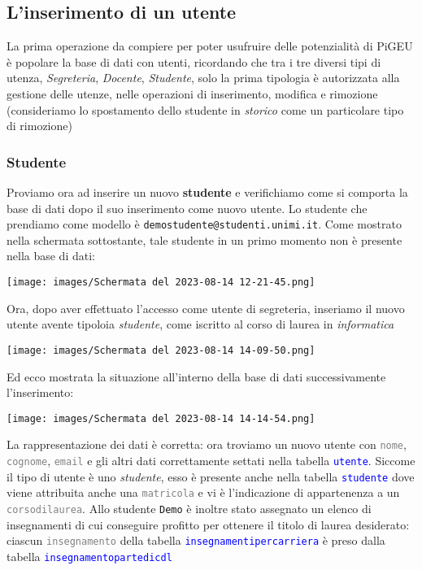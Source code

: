 \documentclass{article}
\newcommand{\tabb}[1]{\texttt{\textcolor{blue}{#1}}}
\newcommand{\attr}[1]{\texttt{\textcolor{gray}{#1}}}
\newcommand{\und}[0]{\textunderscore}
\begin{document}
\subsection{L'inserimento di un utente}
La prima operazione da compiere per poter usufruire delle potenzialità di PiGEU è popolare la base di dati con utenti, ricordando che tra i tre diversi tipi di utenza, \textit{Segreteria}, \textit{Docente}, \textit{Studente}, solo la prima tipologia è autorizzata alla gestione delle utenze, nelle operazioni di inserimento, modifica e rimozione (consideriamo lo spostamento dello studente in \textit{storico} come un particolare tipo di rimozione)
\subsubsection{Studente}
Proviamo ora ad inserire un nuovo \textbf{studente} e verifichiamo come si comporta la base di dati dopo il suo inserimento come nuovo utente.
Lo studente che prendiamo come modello è \texttt{demo\und studente@studenti.unimi.it}. Come mostrato nella schermata sottostante, tale studente in un primo momento non è presente nella base di dati:

\texttt{[image: images/Schermata del 2023-08-14 12-21-45.png]}

Ora, dopo aver effettuato l'accesso come utente di segreteria, inseriamo il nuovo utente avente tipoloia \textit{studente}, come iscritto al corso di laurea in \textit{informatica}

\texttt{[image: images/Schermata del 2023-08-14 14-09-50.png]}

Ed ecco mostrata la situazione all'interno della base di dati successivamente l'inserimento:

\texttt{[image: images/Schermata del 2023-08-14 14-14-54.png]}

La rappresentazione dei dati è corretta: ora troviamo un nuovo utente con \attr{nome}, \attr{cognome}, \attr{email} e gli altri dati correttamente settati nella tabella \tabb{utente}. Siccome il tipo di utente è uno \textit{studente}, esso è presente anche nella tabella \tabb{studente} dove viene attribuita anche una \attr{matricola} e vi è l'indicazione di appartenenza a un \attr{corso\und di\und laurea}. Allo studente \texttt{Demo} è inoltre stato assegnato un elenco di insegnamenti di cui conseguire profitto per ottenere il titolo di laurea desiderato: ciascun \attr{insegnamento} della tabella \tabb{insegnamenti\und per\und carriera} è preso dalla tabella \tabb{insegnamento\und parte\und di\und cdl}
\end{document}
